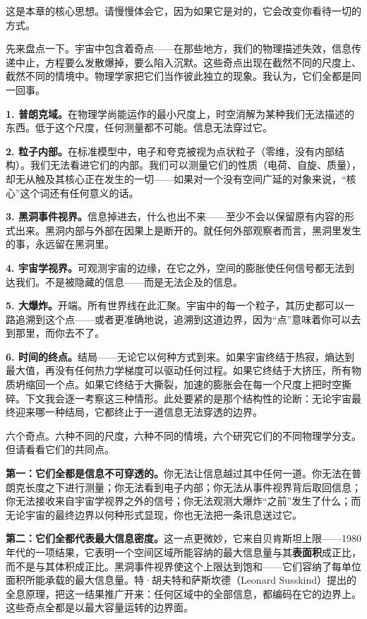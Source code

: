 \documentclass[11pt, twoside, openright]{book}
\begin{document}
这是本章的核心思想。请慢慢体会它，因为如果它是对的，它会改变你看待一切的方式。

先来盘点一下。宇宙中包含着奇点------在那些地方，我们的物理描述失效，信息传递中止，方程要么发散爆掉，要么陷入沉默。这些奇点出现在截然不同的尺度上、截然不同的情境中。物理学家把它们当作彼此独立的现象。我认为，它们全都是同一回事。

\textbf{1. 普朗克域。}在物理学尚能运作的最小尺度上，时空消解为某种我们无法描述的东西。低于这个尺度，任何测量都不可能。信息无法穿过它。

\textbf{2. 粒子内部。}在标准模型中，电子和夸克被视为点状粒子（零维，没有内部结构）。我们无法看进它们的内部。我们可以测量它们的性质（电荷、自旋、质量），却无从触及其核心正在发生的一切------如果对一个没有空间广延的对象来说，“核心”这个词还有任何意义的话。

\textbf{3. 黑洞事件视界。}信息掉进去，什么也出不来------至少不会以保留原有内容的形式出来。黑洞内部与外部在因果上是断开的。就任何外部观察者而言，黑洞里发生的事，永远留在黑洞里。

\textbf{4. 宇宙学视界。}可观测宇宙的边缘，在它之外，空间的膨胀使任何信号都无法到达我们。不是被隐藏的信息------而是无法企及的信息。

\textbf{5. 大爆炸。}开端。所有世界线在此汇聚。宇宙中的每一个粒子，其历史都可以一路追溯到这个点------或者更准确地说，追溯到这道边界，因为“点”意味着你可以去到那里，而你去不了。

\textbf{6. 时间的终点。}结局------无论它以何种方式到来。如果宇宙终结于热寂，熵达到最大值，再没有任何热力学梯度可以驱动任何过程。如果它终结于大挤压，所有物质坍缩回一个点。如果它终结于大撕裂，加速的膨胀会在每一个尺度上把时空撕碎。下文我会逐一考察这三种情形。此处要紧的是那个结构性的论断：无论宇宙最终迎来哪一种结局，它都终止于一道信息无法穿透的边界。

六个奇点。六种不同的尺度，六种不同的情境，六个研究它们的不同物理学分支。但请看看它们的共同点。

\textbf{第一：它们全都是信息不可穿透的。}你无法让信息越过其中任何一道。你无法在普朗克长度之下进行测量；你无法看到电子内部；你无法从事件视界背后取回信息；你无法接收来自宇宙学视界之外的信号；你无法观测大爆炸“之前”发生了什么；而无论宇宙的最终边界以何种形式显现，你也无法把一条讯息送过它。

\textbf{第二：它们全都代表最大信息密度。}这一点更微妙，它来自贝肯斯坦上限------1980年代的一项结果，它表明一个空间区域所能容纳的最大信息量与其\textbf{表面积}成正比，而不是与其体积成正比。黑洞事件视界使这个上限达到饱和------它们容纳了每单位面积所能承载的最大信息量。特·胡夫特和萨斯坎德（Leonard Susskind）提出的全息原理，把这一结果推广开来：任何区域中的全部信息，都编码在它的边界上。这些奇点全都是以最大容量运转的边界面。
\end{document}
